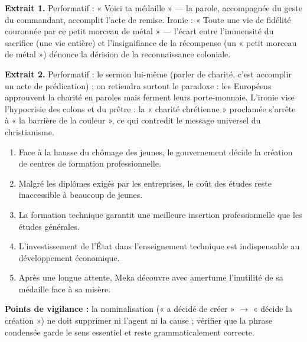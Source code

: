 \documentclass[11pt]{article}
\begin{document}
\begin{corrige}
\textbf{Extrait 1.} Performatif : « Voici ta médaille » — la parole, accompagnée du geste du commandant, accomplit l'acte de remise. Ironie : « Toute une vie de fidélité couronnée par ce petit morceau de métal » — l'écart entre l'immensité du sacrifice (une vie entière) et l'insignifiance de la récompense (un « petit morceau de métal ») dénonce la dérision de la reconnaissance coloniale.

\textbf{Extrait 2.} Performatif : le sermon lui-même (parler de charité, c'est accomplir un acte de prédication) ; on retiendra surtout le paradoxe : les Européens approuvent la charité en paroles mais ferment leurs porte-monnaie. L'ironie vise l'hypocrisie des colons et du prêtre : la « charité chrétienne » proclamée s'arrête à « la barrière de la couleur », ce qui contredit le message universel du christianisme.
\end{corrige}

\begin{corrige}
\begin{enumerate}
    \item Face à la hausse du chômage des jeunes, le gouvernement décide la création de centres de formation professionnelle.
    \item Malgré les diplômes exigés par les entreprises, le coût des études reste inaccessible à beaucoup de jeunes.
    \item La formation technique garantit une meilleure insertion professionnelle que les études générales.
    \item L'investissement de l'État dans l'enseignement technique est indispensable au développement économique.
    \item Après une longue attente, Meka découvre avec amertume l'inutilité de sa médaille face à sa misère.
\end{enumerate}
\textbf{Points de vigilance :} la nominalisation (« a décidé de créer » $\rightarrow$ « décide la création ») ne doit supprimer ni l'agent ni la cause ; vérifier que la phrase condensée garde le sens essentiel et reste grammaticalement correcte.
\end{corrige}
\end{document}
